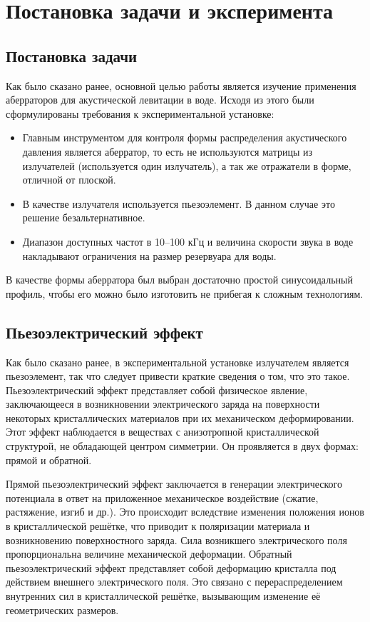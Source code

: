 \section{Постановка задачи и эксперимента}
\label{sec:Chapter3} 

\subsection{Постановка задачи}
Как было сказано ранее, основной целью работы является изучение применения аберраторов для акустической левитации в воде. Исходя из этого были сформулированы требования к экспериментальной установке:
\begin{itemize}
	\item Главным инструментом для контроля формы распределения акустического давления является аберратор, то есть не используются матрицы из излучателей (используется один излучатель), а так же отражатели в форме, отличной от плоской.
	\item В качестве излучателя используется пьезоэлемент. В данном случае это решение безальтернативное.
	\item Диапазон доступных частот в 10--100 кГц и величина скорости звука в воде накладывают ограничения на размер резервуара для воды.
\end{itemize}
В качестве формы аберратора был выбран достаточно простой синусоидальный профиль, чтобы его можно было изготовить не прибегая к сложным технологиям. 
\subsection{Пьезоэлектрический эффект}
Как было сказано ранее, в экспериментальной установке излучателем является пьезоэлемент, так что следует привести краткие сведения о том, что это такое. Пьезоэлектрический эффект представляет собой физическое явление, заключающееся в возникновении электрического заряда на поверхности некоторых кристаллических материалов при их механическом деформировании. Этот эффект наблюдается в веществах с анизотропной кристаллической структурой, не обладающей центром симметрии. Он проявляется в двух формах: прямой и обратной.

Прямой пьезоэлектрический эффект заключается в генерации электрического потенциала в ответ на приложенное механическое воздействие (сжатие, растяжение, изгиб и др.). Это происходит вследствие изменения положения ионов в кристаллической решётке, что приводит к поляризации материала и возникновению поверхностного заряда. Сила возникшего электрического поля пропорциональна величине механической деформации. Обратный пьезоэлектрический эффект представляет собой деформацию кристалла под действием внешнего электрического поля. Это связано с перераспределением внутренних сил в кристаллической решётке, вызывающим изменение её геометрических размеров.

